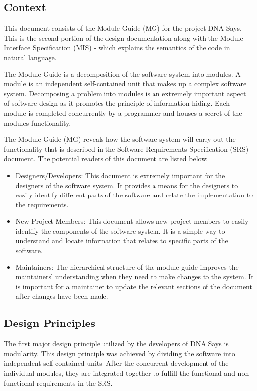 \documentclass[12pt, titlepage]{article}
\begin{document}
\subsection{Context}
\par This document consists of the Module Guide (MG) for the project DNA Says. This is the second portion of the design documentation along with the Module Interface Specification (MIS) - which explains the semantics of the code in natural language. \\
\par The Module Guide is a decomposition of the software system into modules. A module is an independent self-contained unit that makes up a complex software system. Decomposing a problem into modules is an extremely important aspect of software design as it promotes the principle of information hiding. Each module is completed concurrently by a programmer and houses a secret of the modules functionality.\\
\par The Module Guide (MG) reveals how the software system will carry out the functionality that is described in the Software Requirements Specification (SRS) document. The potential readers of this document are listed below:
\begin{itemize}
\item Designers/Developers: This document is extremely important for the designers of the software system. It provides a means for the designers to easily identify different parts of the software and relate the implementation to the requirements.
\item New Project Members: This document allows new project members to easily identify the components of the software system. It is a simple way to understand and locate information that relates to specific parts of the software. 
\item Maintainers: The hierarchical structure of the module guide improves the maintainers' understanding when they need to make changes to the system. It is important for a maintainer to update the relevant sections of the document after changes have been made.
\end{itemize}

\subsection{Design Principles}
\par The first major design principle utilized by the developers of DNA Says is modularity. This design principle was achieved by dividing the software into independent self-contained units. After the concurrent development of the individual modules, they are integrated together to fulfill the functional and non-functional requirements in the SRS.\\
\end{document}
